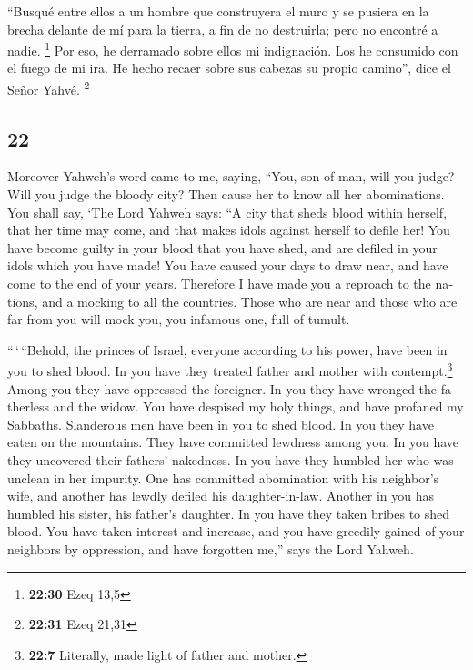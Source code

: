 \begin{paracol}{2}
 ``Busqué entre ellos a un hombre que construyera el muro
y se pusiera en la brecha delante de mí para la tierra, a fin de no
destruirla; pero no encontré a nadie. \footnote{\textbf{22:30} Ezeq 13,5}
 Por eso, he derramado sobre ellos mi indignación. Los he
consumido con el fuego de mi ira. He hecho recaer sobre sus cabezas su
propio camino'', dice el Señor Yahvé. \footnote{\textbf{22:31} Ezeq
  21,31}

\switchcolumn
\begin{otherlanguage}{english}

\hypertarget{section-43}{%
\section{22}\label{section-43}}

 Moreover Yahweh's word came to me, saying, 
``You, son of man, will you judge? Will you judge the bloody city? Then
cause her to know all her abominations.  You shall say,
`The Lord Yahweh says: ``A city that sheds blood within herself, that
her time may come, and that makes idols against herself to defile her!
 You have become guilty in your blood that you have shed,
and are defiled in your idols which you have made! You have caused your
days to draw near, and have come to the end of your years. Therefore I
have made you a reproach to the nations, and a mocking to all the
countries.  Those who are near and those who are far from
you will mock you, you infamous one, full of tumult.

 ``\,`\,``Behold, the princes of Israel, everyone
according to his power, have been in you to shed blood. 
In you have they treated father and mother with contempt.\footnote{\textbf{22:7}
  Literally, made light of father and mother.} Among you they have
oppressed the foreigner. In you they have wronged the fatherless and the
widow.  You have despised my holy things, and have
profaned my Sabbaths.  Slanderous men have been in you to
shed blood. In you they have eaten on the mountains. They have committed
lewdness among you.  In you have they uncovered their
fathers' nakedness. In you have they humbled her who was unclean in her
impurity.  One has committed abomination with his
neighbor's wife, and another has lewdly defiled his daughter-in-law.
Another in you has humbled his sister, his father's daughter.
 In you have they taken bribes to shed blood. You have
taken interest and increase, and you have greedily gained of your
neighbors by oppression, and have forgotten me,'' says the Lord Yahweh.


\end{otherlanguage}
\end{paracol}
